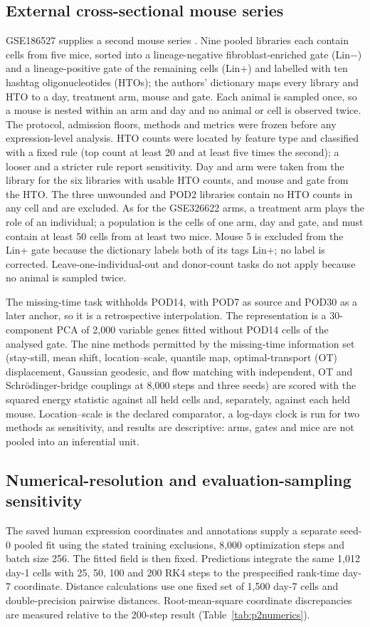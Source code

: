 \documentclass[10pt,a4paper]{article}
\begin{document}
\subsection{External cross-sectional mouse series}
GSE186527 supplies a second mouse series \citep{mascharak2022multiomic}. Nine pooled libraries each contain cells from five mice, sorted into a lineage-negative fibroblast-enriched gate (Lin$-$) and a lineage-positive gate of the remaining cells (Lin+) and labelled with ten hashtag oligonucleotides (HTOs); the authors' dictionary maps every library and HTO to a day, treatment arm, mouse and gate. Each animal is sampled once, so a mouse is nested within an arm and day and no animal or cell is observed twice. The protocol, admission floors, methods and metrics were frozen before any expression-level analysis. HTO counts were located by feature type and classified with a fixed rule (top count at least 20 and at least five times the second); a looser and a stricter rule report sensitivity. Day and arm were taken from the library for the six libraries with usable HTO counts, and mouse and gate from the HTO. The three unwounded and POD2 libraries contain no HTO counts in any cell and are excluded. As for the GSE326622 arms, a treatment arm plays the role of an individual; a population is the cells of one arm, day and gate, and must contain at least 50 cells from at least two mice. Mouse 5 is excluded from the Lin+ gate because the dictionary labels both of its tags Lin+; no label is corrected. Leave-one-individual-out and donor-count tasks do not apply because no animal is sampled twice.

The missing-time task withholds POD14, with POD7 as source and POD30 as a later anchor, so it is a retrospective interpolation. The representation is a 30-component PCA of 2,000 variable genes fitted without POD14 cells of the analysed gate. The nine methods permitted by the missing-time information set (stay-still, mean shift, location--scale, quantile map, optimal-transport (OT) displacement, Gaussian geodesic, and flow matching with independent, OT and Schr\"odinger-bridge couplings at 8,000 steps and three seeds) are scored with the squared energy statistic against all held cells and, separately, against each held mouse. Location--scale is the declared comparator, a log-days clock is run for two methods as sensitivity, and results are descriptive: arms, gates and mice are not pooled into an inferential unit.

\subsection{Numerical-resolution and evaluation-sampling sensitivity}
The saved human expression coordinates and annotations supply a separate seed-0 pooled fit using the stated training exclusions, 8,000 optimization steps and batch size 256. The fitted field is then fixed. Predictions integrate the same 1,012 day-1 cells with 25, 50, 100 and 200 RK4 steps to the prespecified rank-time day-7 coordinate. Distance calculations use one fixed set of 1,500 day-7 cells and double-precision pairwise distances. Root-mean-square coordinate discrepancies are measured relative to the 200-step result (Table~\ref{tab:p2numerics}).
\end{document}
